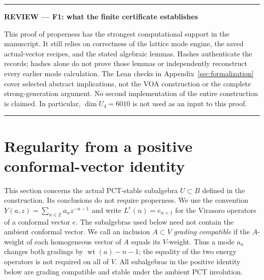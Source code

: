 \documentclass[11pt,a4paper]{article}
\theoremstyle{definition}
\newenvironment{reviewnote}[1]{\par\addvspace{8pt}\begingroup
  \color{Sepia}\noindent\rule{\linewidth}{0.7pt}\par\nobreak
  \noindent\textbf{REVIEW --- #1}\par\nobreak\small\noindent\ignorespaces
}{\par\noindent\rule{\linewidth}{0.7pt}\par\endgroup\addvspace{8pt}}
\begin{document}
\begin{reviewnote}{F1: what the finite certificate establishes}
This proof of properness has the strongest computational support in the
manuscript. It still relies on correctness of the lattice mode engine,
the saved actual-vector recipes, and the stated algebraic lemmas.
Hashes authenticate the records; hashes alone do not prove those lemmas
or independently reconstruct every earlier mode calculation. The Lean
checks in Appendix~\ref{sec:formalization} cover selected abstract
implications, not the VOA construction or the complete strong-generation
argument. No second implementation of the entire construction is
claimed. In particular, \(\dim U_4=6010\) is not used as an input to
this proof.
\end{reviewnote}


\section{Regularity from a positive conformal-vector identity}
\label{sec:regularity}

This section concerns the actual PCT-stable subalgebra $U\subset B$ defined
in the construction. Its conclusions do not require properness. We use
the convention $Y(a,z)=\sum_{n\in\mathbb Z}a_nz^{-n-1}$ and write
$L^e(n)=e_{n+1}$ for the Virasoro operators of a conformal vector $e$.
The subalgebras used below need not contain the ambient conformal vector.
We call an inclusion $A\subset V$ \emph{grading compatible} if the
$A$-weight of each homogeneous vector of $A$ equals its $V$-weight.
Thus a mode $a_n$ changes both gradings by $\operatorname{wt}(a)-n-1$;
the equality of the two energy operators is not required on all of $V$.
All subalgebras in the positive identity below are grading compatible
and stable under the ambient PCT involution.
\end{document}
